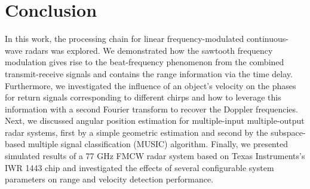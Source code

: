 \chapter{Conclusion}
In this work, the processing chain for linear frequency-modulated 
continuous-wave radars was explored. We demonstrated how the sawtooth frequency modulation
gives rise to the beat-frequency phenomenon from the combined transmit-receive
signals and contains the range information via the time delay. Furthermore, we
investigated the influence of an object's velocity on the phases for return
signals corresponding to different chirps and how to leverage this information
with a second Fourier transform to recover the Doppler frequencies. Next, we
discussed angular position estimation for multiple-input multiple-output radar
systems, first by a simple geometric estimation and second by the
subspace-based multiple signal classification (MUSIC) algorithm. Finally, we
presented simulated results of a 77 GHz FMCW radar system based on Texas Instruments's
IWR 1443 chip and investigated the effects of several configurable system
parameters on range and velocity detection performance.
